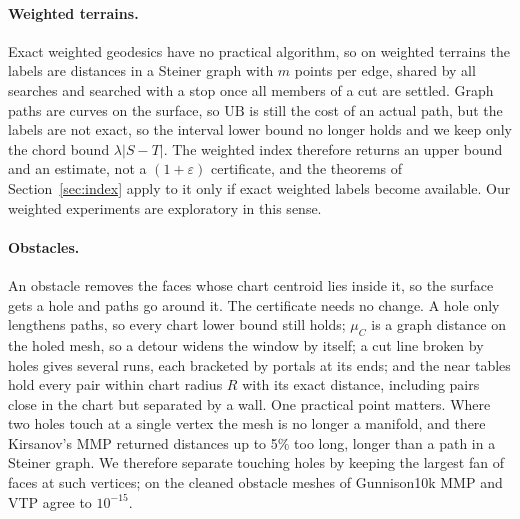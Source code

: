\documentclass[sigconf,nonacm,screen]{acmart}
\newcommand{\UB}{\mathrm{UB}}
\newcommand{\eps}{\varepsilon}
\begin{document}
\paragraph{Weighted terrains.}
Exact weighted geodesics have no practical algorithm, so on weighted terrains the labels are distances in a
Steiner graph with $m$ points per edge, shared by all searches and searched with a stop once all members of a
cut are settled. Graph paths are curves on the surface, so $\UB$ is still the cost of an actual path, but the
labels are not exact, so the interval lower bound no longer holds and we keep only the chord bound
$\lambda|S-T|$. The weighted index therefore returns an upper bound and an estimate, not a $(1+\eps)$
certificate, and the theorems of Section~\ref{sec:index} apply to it only if exact weighted labels become
available. Our weighted experiments are exploratory in this sense.

\paragraph{Obstacles.}
An obstacle removes the faces whose chart centroid lies inside it, so the surface gets a hole and paths go
around it. The certificate needs no change. A hole only lengthens paths, so every chart lower bound still
holds; $\mu_C$ is a graph distance on the holed mesh, so a detour widens the window by itself; a cut line
broken by holes gives several runs, each bracketed by portals at its ends; and the near tables hold every pair
within chart radius $R$ with its exact distance, including pairs close in the chart but separated by a wall.
One practical point matters. Where two holes touch at a single vertex the mesh is no longer a manifold, and
there Kirsanov's MMP returned distances up to 5\% too long, longer than a path in a Steiner graph. We
therefore separate touching holes by keeping the largest fan of faces at such vertices; on the cleaned obstacle
meshes of Gunnison10k MMP and VTP agree to $10^{-15}$.
\end{document}
